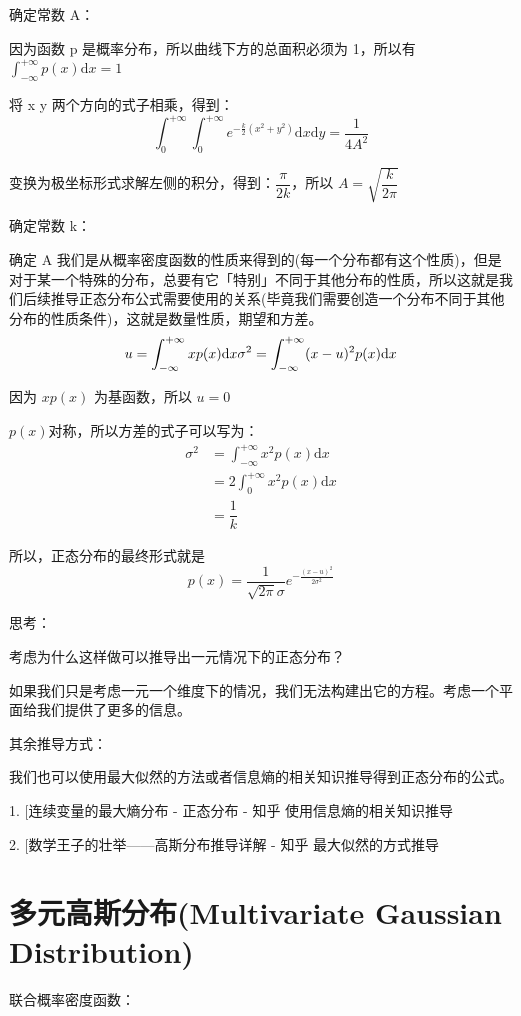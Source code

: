 \documentclass[12pt, a4paper, oneside]{ctexbook}
\begin{document}
 确定常数 A：

因为函数 p 是概率分布，所以曲线下方的总面积必须为 1，所以有 $\int_{-\infty}^{+\infty}p(x)\mathrm{d}x = 1$

将 x y 两个方向的式子相乘，得到：
$$
\int_0^{+\infty}\int_0^{+\infty}e^{-\frac{k}{2}(x^{2} + y^{2})} \mathrm{d}x\mathrm{d}y = \dfrac{1}{4A^{2}}
$$

变换为极坐标形式求解左侧的积分，得到：$\dfrac{\pi}{2k}$，所以 $A = \sqrt{\dfrac{k}{2\pi}}$

 确定常数 k：

确定 A 我们是从概率密度函数的性质来得到的(每一个分布都有这个性质)，但是对于某一个特殊的分布，总要有它「特别」不同于其他分布的性质，所以这就是我们后续推导正态分布公式需要使用的关系(毕竟我们需要创造一个分布不同于其他分布的性质条件)，这就是数量性质，期望和方差。
$$
u = \int_{-\infty}^{+\infty} xp(x)\mathrm{d}x \\
\sigma^{2} = \int_{-\infty}^{+\infty}(x - u)^{2} p(x)\mathrm{d}x
$$

因为 $xp(x)$ 为基函数，所以 $u = 0$

$p(x)$对称，所以方差的式子可以写为：
$$
\begin{aligned}
\sigma^{2} &=\int_{-\infty}^{+\infty}x^{2}p(x)\mathrm{d}x \\
&= 2\int_0^{+\infty}x^{2}p(x)\mathrm{d}x \\
&= \dfrac{1}{k}
\end{aligned}
$$

所以，正态分布的最终形式就是
$$
p(x) = \dfrac{1}{\sqrt{2\pi}\sigma}e^{-\frac{(x - u)^{2}}{2\sigma^{2}}}
$$

 思考：

考虑为什么这样做可以推导出一元情况下的正态分布？

如果我们只是考虑一元一个维度下的情况，我们无法构建出它的方程。考虑一个平面给我们提供了更多的信息。

 其余推导方式：

我们也可以使用最大似然的方法或者信息熵的相关知识推导得到正态分布的公式。

1. [连续变量的最大熵分布 - 正态分布 - 知乎 使用信息熵的相关知识推导

2. [数学王子的壮举——高斯分布推导详解 - 知乎 最大似然的方式推导

\section{多元高斯分布(Multivariate Gaussian Distribution)}

 联合概率密度函数：
\end{document}
